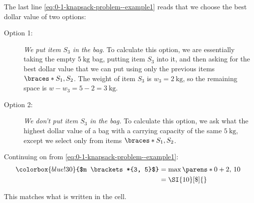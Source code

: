The last line \eqref{eq:0-1-knapsack-problem--example1} reads that we choose the best dollar value of two options:
\begin{pindent}
\begin{description}
    \item[Option 1:] \emph{We put item $S_3$ in the bag.} To calculate this option, we are essentially taking the empty $\qty{5}{\kilo\gram}$ bag, putting item $S_3$ into it, and then asking for the best dollar value that we can put  using only the previous items $\braces*{S_1, S_2}$. The weight of item $S_3$ is $w_3 = \qty{2}{\kilo\gram}$, so the remaining space is $w - w_3 = 5 - 2 = \qty{3}{\kilo\gram}$.
    \item[Option 2:] \emph{We don't put item $S_3$ in the bag.} To calculate this option, we ask what the highest dollar value of a bag with a carrying capacity of the same $\qty{5}{\kilo\gram}$, except we select only from items $\braces*{S_1, S_2}$.
\end{description}
\end{pindent}

Continuing on from \eqref{eq:0-1-knapsack-problem--example1}:
\begin{align*}
    \colorbox{blue!30}{$m \brackets*{3, 5}$} &= \max\parens*{0 + 2, \, 10}
    \\
    &= \SI{10}[\$]{}
\end{align*}

This matches what is written in the cell.

